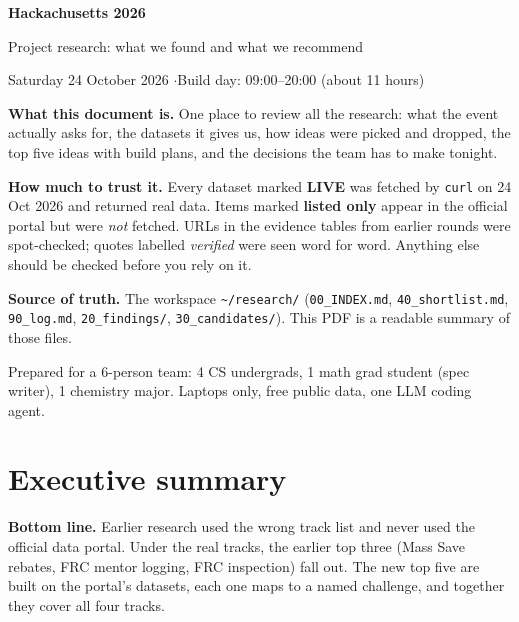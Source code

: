 \documentclass[11pt]{article}
\newcommand{\LIVE}{\textcolor{okgreen}{\textbf{LIVE}}}
\newcommand{\LISTED}{\textcolor{greyish}{\textbf{listed only}}}
\begin{document}
\begin{titlepage}
\centering
\vspace*{2cm}
{\Huge\bfseries Hackachusetts 2026\par}
\vspace{0.4cm}
{\LARGE Project research: what we found and what we recommend\par}
\vspace{1.2cm}
{\large Saturday 24 October 2026 \quad$\cdot$\quad Build day: 09:00--20:00 (about 11 hours)\par}
\vspace{1.5cm}
\begin{notebox}[width=0.85\textwidth]
\textbf{What this document is.} One place to review all the research: what the
event actually asks for, the datasets it gives us, how ideas were picked and dropped, the top
five ideas with build plans, and the decisions the team has to make tonight.

\textbf{How much to trust it.} Every dataset marked \LIVE{} was fetched by
\texttt{curl} on 24 Oct 2026 and returned real data. Items marked \LISTED{} appear in the
official portal but were \emph{not} fetched. URLs in the evidence tables from earlier rounds
were spot-checked; quotes labelled \emph{verified} were seen word for word. Anything else
should be checked before you rely on it.

\textbf{Source of truth.} The workspace \texttt{\textasciitilde/research/}
(\texttt{00\_INDEX.md}, \texttt{40\_shortlist.md}, \texttt{90\_log.md}, \texttt{20\_findings/},
\texttt{30\_candidates/}). This PDF is a readable summary of those files.
\end{notebox}
\vfill
{\small Prepared for a 6-person team: 4 CS undergrads, 1 math grad student (spec writer),
1 chemistry major. Laptops only, free public data, one LLM coding agent.\par}
\end{titlepage}

\tableofcontents
\newpage

\section{Executive summary}

\textbf{Bottom line.} Earlier research used the wrong track list and never used the official
data portal. Under the real tracks, the earlier top three (Mass Save rebates, FRC mentor
logging, FRC inspection) fall out. The new top five are built on the portal's datasets,
each one maps to a named challenge, and together they cover all four tracks.
\end{document}
